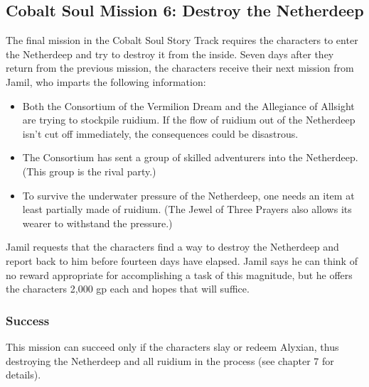 \documentclass[10pt,a4,twoside,twocolumn,openany,nodeprecatedcode]{dndbook}
\begin{document}
\subsection{Cobalt Soul Mission 6: Destroy the Netherdeep}
The final mission in the Cobalt Soul Story Track requires the characters to enter the Netherdeep and try to destroy it from the inside.
Seven days after they return from the previous mission, the characters receive their next mission from Jamil, who imparts the following information:
\begin{itemize}

\item Both the Consortium of the Vermilion Dream and the Allegiance of Allsight are trying to stockpile ruidium. If the flow of ruidium out of the Netherdeep isn't cut off immediately, the consequences could be disastrous.
\item The Consortium has sent a group of skilled adventurers into the Netherdeep. (This group is the rival party.)
\item To survive the underwater pressure of the Netherdeep, one needs an item at least partially made of ruidium. (The Jewel of Three Prayers also allows its wearer to withstand the pressure.)
\end{itemize}


Jamil requests that the characters find a way to destroy the Netherdeep and report back to him before fourteen days have elapsed. Jamil says he can think of no reward appropriate for accomplishing a task of this magnitude, but he offers the characters 2,000 gp each and hopes that will suffice.
\subsubsection{Success}
This mission can succeed only if the characters slay or redeem Alyxian, thus destroying the Netherdeep and all ruidium in the process (see chapter 7 for details).
\end{document}
